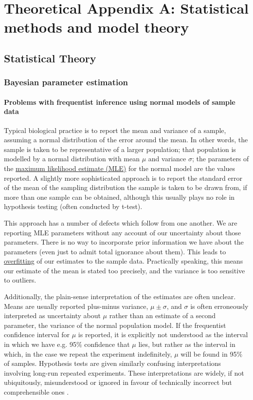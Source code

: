 \chapter{Theoretical Appendix A: Statistical methods and model theory}

\section{Statistical Theory}
\subsection{Bayesian parameter estimation}
\label{ssec:Bayes}
\subsubsection{Problems with frequentist inference using normal models of sample data}
Typical biological practice is to report the mean and variance of a sample, assuming a normal distribution of the error around the mean. In other words, the sample is taken to be representative of a larger population; that population is modelled by a normal distribution with mean $\mu$ and variance $\sigma$; the parameters of the \hyperref[MLE]{maximum likelihood estimate (MLE)} for the normal model are the values reported. A slightly more sophisticated approach is to report the standard error of the mean of the sampling distribution the sample is taken to be drawn from, if more than one sample can be obtained, although this usually plays no role in hypothesis testing (often conducted by t-test).

This approach has a number of defects which follow from one another. We are reporting MLE parameters without any account of our uncertainty about those parameters. There is no way to incorporate prior information we have about the parameters (even just to admit total ignorance about them). This leads to \hyperref[overfit]{overfitting} of our estimates to the sample data. Practically speaking, this means our estimate of the mean is stated too precisely, and the variance is too sensitive to outliers.

Additionally, the plain-sense interpretation of the estimates are often unclear. Means are usually reported plus-minus variance, $\mu\pm\sigma$, and $\sigma$ is often erroneously interpreted as uncertainty about $\mu$ rather than an estimate of a second parameter, the variance of the normal population model. If the frequentist confidence interval for $\mu$ is reported, it is explicitly not understood as the interval in which we have e.g. 95$\%$ confidence that $\mu$ lies, but rather as the interval in which, in the case we repeat the experiment indefinitely, $\mu$ will be found in 95$\%$ of samples. Hypothesis tests are given similarly confusing interpretations involving long-run repeated experiments. These interpretations are widely, if not ubiquitously, misunderstood or ignored in favour of technically incorrect but comprehensible ones \cite{Hoekstra2014, Greenland2016}.

